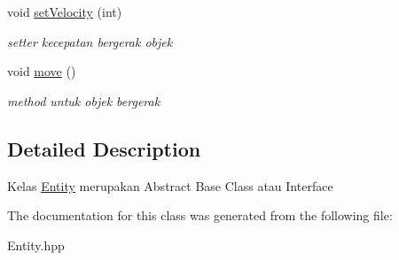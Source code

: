 \begin{DoxyCompactItemize}
void \hyperlink{classEntity_ab91bc74ca735bc2172d4eac1ed79ed2a}{set\+Velocity} (int)
\begin{DoxyCompactList}\small\item\em setter kecepatan bergerak objek \end{DoxyCompactList}\item 
\mbox{\label{classEntity_ac1f12a5f7922624ee7ced15be3b884de}} 
void \hyperlink{classEntity_ac1f12a5f7922624ee7ced15be3b884de}{move} ()
\begin{DoxyCompactList}\small\item\em method untuk objek bergerak \end{DoxyCompactList}\end{DoxyCompactItemize}


\subsection{Detailed Description}
Kelas \hyperlink{classEntity}{Entity} merupakan Abstract Base Class atau Interface 

The documentation for this class was generated from the following file\+:\begin{DoxyCompactItemize}
\item 
Entity.\+hpp\end{DoxyCompactItemize}
